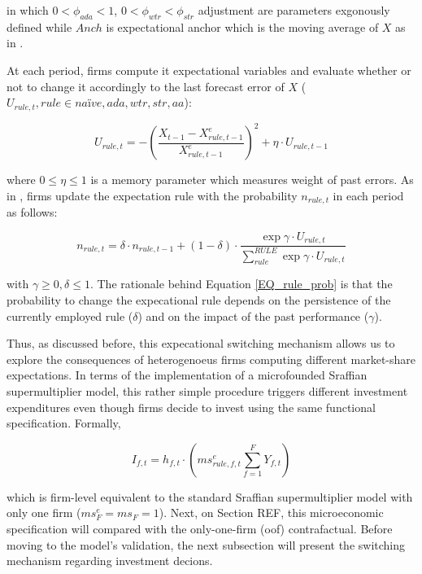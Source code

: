 \documentclass[12pt,openright,oneside,a4paper,english,sumario=tradicional]{gpsabntex}
\numberwithin{listing}{chapter}
\begin{document}
in which \(0 < \phi_{ada} < 1\), \(0 < \phi_{wtr} < \phi_{str}\) adjustment are parameters exgonously defined while \(Anch\) is expectational anchor which is the moving average of \(X\) as in \textcite{reissl_2021_Heterogeneousa}.

At each period, firms compute it expectational variables and evaluate whether or not to change it accordingly to the last forecast error of \(X\) (\(U_{rule,t}, rule \in {na\text{\"i}ve}, ada, wtr, str, aa\)):
\begin{latex}
\begin{equation}
\label{Ch_super_EQ_LFE}
U_{rule,t} = - \left(\frac{X_{t-1} - X^{e}_{rule,t-1}}{X^{e}_{rule,t-1}}\right)^{2} + \eta\cdot U_{rule,t-1}
\end{equation}
\end{latex}
where \(0 \leq \eta \leq 1\) is a memory parameter which measures weight of past errors.
As in \textcite{dosi_2020_RATIONAL}, firms update the expectation rule with the probability \(n_{rule,t}\) in each period as follows:
\begin{latex}
\begin{equation}
\label{Ch_super_EQ_rule_prob}
n_{rule,t} = \delta\cdot n_{rule,t-1} + (1-\delta)\cdot \frac{\exp{\gamma\cdot U_{rule,t}}}{\sum_{rule}^{RULE}\exp{\gamma\cdot U_{rule,t}}}
\end{equation}
\end{latex}
with \(\gamma \geq 0, \delta \leq 1\).
The rationale behind Equation \ref{EQ_rule_prob} is that the probability to change the expecational rule depends on the persistence of the currently employed rule (\(\delta\)) and on the impact of the past performance (\(\gamma\)).

Thus, as discussed before, this expecational switching mechanism allows us to explore the consequences of heterogenoeus firms computing different market-share expectations.
In terms of the implementation of a microfounded Sraffian supermultiplier model, this rather simple procedure triggers different investment expenditures even though firms decide to invest using the same functional specification.
Formally,


\begin{latex}
\begin{equation}
I_{f,t} = h_{f,t} \cdot \left(ms^{e}_{rule,f,t} \sum_{f=1}^{F}Y_{f,t}\right)
\end{equation}
\end{latex}
which is firm-level equivalent to the standard Sraffian supermultiplier model with only one firm (\(ms^{e}_{F} = ms_{F} = 1\)).
Next, on Section REF, this microeconomic specification will compared with the only-one-firm (oof) contrafactual.
Before moving to the model's validation, the next subsection will present the switching mechanism regarding investment decions.
\end{document}
